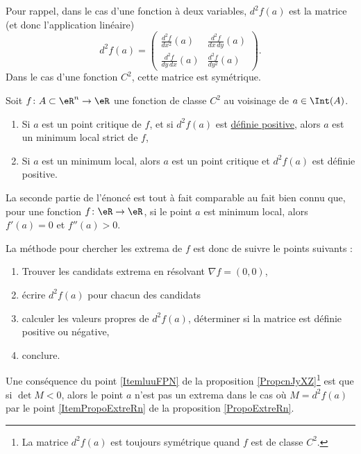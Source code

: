 Pour rappel, dans le cas d'une fonction à deux variables, $d^2f(a)$ est la matrice (et donc l'application linéaire)
\begin{equation}
    d^2f(a)=\begin{pmatrix}
    \frac{ d^2f  }{ dx^2 }(a)   &   \frac{ d^2f  }{ dx\,dy }(a) \\ 
    \frac{ d^2f  }{ dy\,dx }(a)     &   \frac{ d^2f  }{ dy^2 }(a)
\end{pmatrix}.
\end{equation}
Dans le cas d'une fonction $C^2$, cette matrice est symétrique.

\begin{proposition}     \label{PropoExtreRn}
    Soit $f\colon A\subset\eR^n\to \eR$ une fonction de classe $C^2$ au voisinage de $a\in\Int(A)$.
    \begin{enumerate}
        \item
            Si $a$ est un point critique de $f$, et si $d^2f(a)$ est \href{http://fr.wikipedia.org/wiki/Matrice_définie_positive}{définie positive}, alors $a$ est un minimum local strict de $f$,
        \item\label{ItemPropoExtreRn}
            Si $a$ est un minimum local, alors $a$ est un point critique et $d^2f(a)$ est définie positive.
    \end{enumerate}
\end{proposition}
La seconde partie de l'énoncé est tout à fait comparable au fait bien connu que, pour une fonction $f\colon \eR\to \eR$, si le point $a$ est minimum local, alors $f'(a)=0$ et $f''(a)>0$.

La méthode pour chercher les extrema de $f$ est donc de suivre le points suivants :
\begin{enumerate}
    \item
        Trouver les candidats extrema en résolvant $\nabla f=(0,0)$,
    \item
        écrire $d^2f(a)$ pour chacun des candidats
    \item
        calculer les valeurs propres de $d^2f(a)$, déterminer si la matrice est définie positive ou négative,
    \item
        conclure.
\end{enumerate}

Une conséquence du point \ref{ItemluuFPN} de la proposition \ref{PropcnJyXZ}\footnote{La matrice $d^2f(a)$ est toujours symétrique quand $f$ est de classe $C^2$.} est que si \( \det M<0\), alors le point \( a\) n'est pas  un extrema dans le cas où $M=d^2f(a)$ par le point \ref{ItemPropoExtreRn} de la proposition \ref{PropoExtreRn}.

